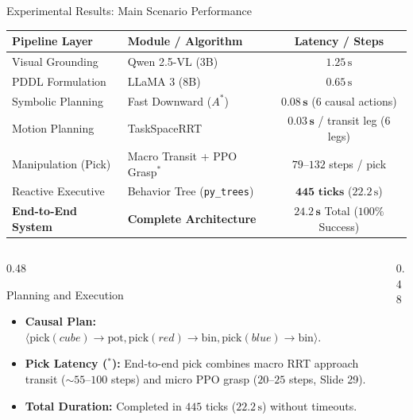 \documentclass[10pt]{beamer}
\begin{document}
\begin{frame}{Experimental Results: Main Scenario Performance}
    \centering
    \scriptsize
    \begin{tabular}{llc}
        \hline
        \textbf{Pipeline Layer} & \textbf{Module / Algorithm} & \textbf{Latency / Steps} \\
        \hline
        Visual Grounding & Qwen 2.5-VL (3B) & $1.25\,\text{s}$ \\
        PDDL Formulation & LLaMA 3 (8B) & $0.65\,\text{s}$ \\
        Symbolic Planning & Fast Downward ($A^*$) & $\mathbf{0.08\,\text{s}}$ ($6$ causal actions) \\
        Motion Planning & TaskSpaceRRT & $\mathbf{0.03\,\text{s}}$ / transit leg ($6$ legs) \\
        Manipulation (Pick) & Macro Transit + PPO Grasp$^\ast$ & $79$--$132$ steps / pick \\
        Reactive Executive & Behavior Tree (\texttt{py\_trees}) & $\mathbf{445\text{ ticks}}$ ($22.2\,\text{s}$) \\
        \hline
        \textbf{End-to-End System} & \textbf{Complete Architecture} & $\mathbf{24.2\,\text{s}}$ Total ($100\%$ Success) \\
        \hline
    \end{tabular}
    \vspace{0.10cm}
    \begin{columns}[T,totalwidth=\textwidth]
        \begin{column}{0.48\textwidth}
            \begin{block}{Planning and Execution}
                \begin{itemize}\scriptsize
                    \item \textbf{Causal Plan:} $\langle \text{pick}(cube) \to \text{pot}, \text{pick}(red) \to \text{bin}, \text{pick}(blue) \to \text{bin} \rangle$.
                    \item \textbf{Pick Latency ($^\ast$):} End-to-end pick combines macro RRT approach transit ($\sim 55$--$100$ steps) and micro PPO grasp ($20$--$25$ steps, Slide 29).
                    \item \textbf{Total Duration:} Completed in $445$ ticks ($22.2\,\text{s}$) without timeouts.
                \end{itemize}
            \end{block}
        \end{column}
        \begin{column}{0.48\textwidth}

\end{column}
\end{columns}
\end{frame}
\end{document}
